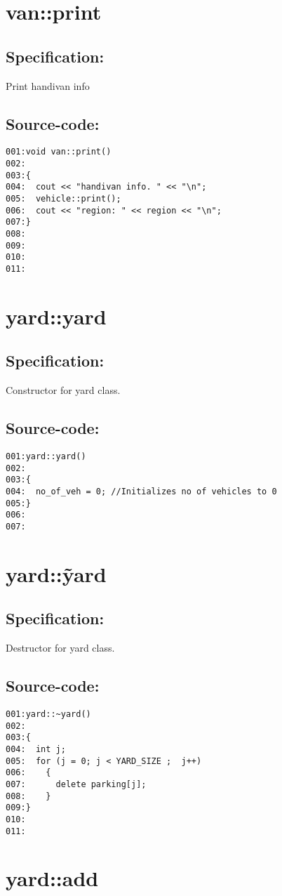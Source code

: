 \section{van::print}
\subsection*{Specification:}
Print handivan info
\subsection*{Source-code:}
\begin{verbatim}
001:void van::print()
002:
003:{
004:  cout << "handivan info. " << "\n";
005:  vehicle::print();
006:  cout << "region: " << region << "\n";
007:}
008:
009:
010:
011:
\end{verbatim}
\section{yard::yard}
\subsection*{Specification:}
Constructor for yard class.
\subsection*{Source-code:}
\begin{verbatim}
001:yard::yard()
002:
003:{
004:  no_of_veh = 0; //Initializes no of vehicles to 0 
005:}
006:
007:
\end{verbatim}
\section{yard::\~yard}
\subsection*{Specification:}
Destructor for yard class.
\subsection*{Source-code:}
\begin{verbatim}
001:yard::~yard()
002:
003:{
004:  int j;
005:  for (j = 0; j < YARD_SIZE ;  j++)
006:    {
007:      delete parking[j];
008:    }
009:}
010:
011:
\end{verbatim}
\section{yard::add}
